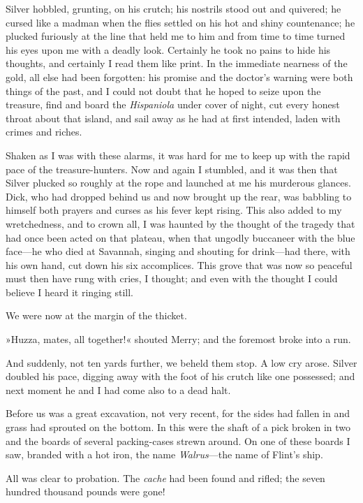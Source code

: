 Silver hobbled, grunting, on his crutch; his nostrils stood out and quivered; he cursed like a madman when the flies settled on his hot and shiny countenance; he plucked furiously at the line that held me to him and from time to time turned his eyes upon me with a deadly look. Certainly he took no pains to hide his thoughts, and certainly I read them like print. In the immediate nearness of the gold, all else had been forgotten: his promise and the doctor's warning were both things of the past, and I could not doubt that he hoped to seize upon the treasure, find and board the \textit{Hispaniola} under cover of night, cut every honest throat about that island, and sail away as he had at first intended, laden with crimes and riches.

Shaken as I was with these alarms, it was hard for me to keep up with the rapid pace of the treasure-hunters. Now and again I stumbled, and it was then that Silver plucked so roughly at the rope and launched at me his murderous glances. Dick, who had dropped behind us and now brought up the rear, was babbling to himself both prayers and curses as his fever kept rising. This also added to my wretchedness, and to crown all, I was haunted by the thought of the tragedy that had once been acted on that plateau, when that ungodly buccaneer with the blue face—he who died at Savannah, singing and shouting for drink—had there, with his own hand, cut down his six accomplices. This grove that was now so peaceful must then have rung with cries, I thought; and even with the thought I could believe I heard it ringing still.

We were now at the margin of the thicket.

»Huzza, mates, all together!« shouted Merry; and the foremost broke into a run.

And suddenly, not ten yards further, we beheld them stop. A low cry arose. Silver doubled his pace, digging away with the foot of his crutch like one possessed; and next moment he and I had come also to a dead halt.

Before us was a great excavation, not very recent, for the sides had fallen in and grass had sprouted on the bottom. In this were the shaft of a pick broken in two and the boards of several packing-cases strewn around. On one of these boards I saw, branded with a hot iron, the name \textit{Walrus}—the name of Flint's ship.

All was clear to probation. The \textit{cache} had been found and rifled; the seven hundred thousand pounds were gone!